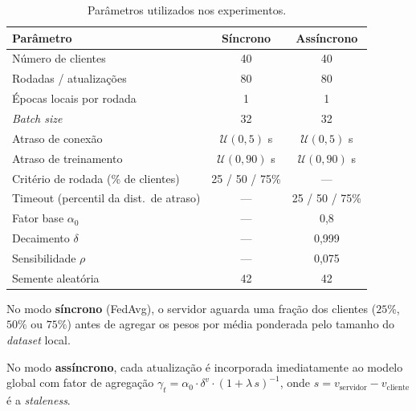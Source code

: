 \documentclass[12pt, a4paper]{article}
\begin{document}
\begin{table}[H]
\centering
\caption{Parâmetros utilizados nos experimentos.}
\label{tab:params}
\renewcommand{\arraystretch}{1.25}
\begin{tabular}{lcc}
\toprule
\textbf{Parâmetro} & \textbf{Síncrono} & \textbf{Assíncrono} \\
\midrule
Número de clientes                     & 40                    & 40                    \\
Rodadas / atualizações                 & 80                    & 80                    \\
Épocas locais por rodada               & 1                     & 1                     \\
\textit{Batch size}                    & 32                    & 32                    \\
Atraso de conexão                      & $\mathcal{U}(0,5)$ s  & $\mathcal{U}(0,5)$ s  \\
Atraso de treinamento                  & $\mathcal{U}(0,90)$ s & $\mathcal{U}(0,90)$ s \\
Critério de rodada (\% de clientes)    & 25 / 50 / 75\%        & —                     \\
Timeout (percentil da dist.\ de atraso)& —                     & 25 / 50 / 75\%        \\
Fator base $\alpha_0$                  & —                     & 0{,}8                 \\
Decaimento $\delta$                    & —                     & 0{,}999               \\
Sensibilidade $\rho$                   & —                     & 0{,}075               \\
Semente aleatória                      & 42                    & 42                    \\
\bottomrule
\end{tabular}
\end{table}

No modo \textbf{síncrono} (FedAvg), o servidor aguarda uma fração dos clientes
($25\%$, $50\%$ ou $75\%$) antes de agregar os pesos por média ponderada pelo
tamanho do \textit{dataset} local.

No modo \textbf{assíncrono}, cada atualização é incorporada imediatamente ao
modelo global com fator de agregação
$\gamma_t = \alpha_0 \cdot \delta^{v} \cdot (1 + \lambda\, s)^{-1}$,
onde $s = v_{\text{servidor}} - v_{\text{cliente}}$ é a \textit{staleness}.
\end{document}
